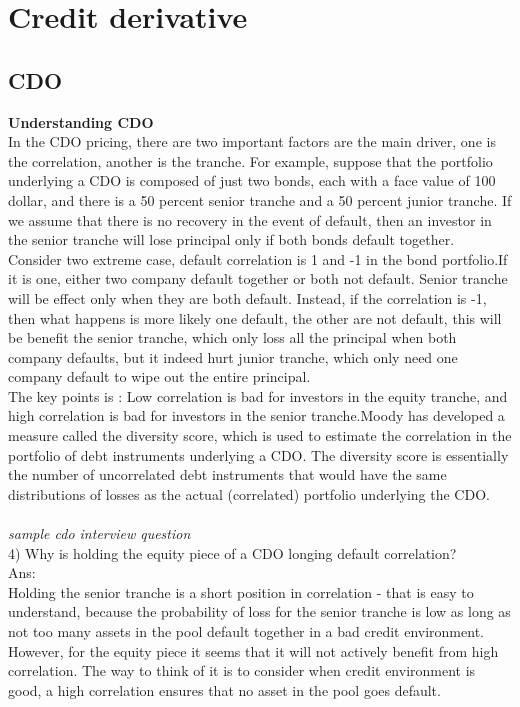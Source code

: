 \documentclass[a4paper,11pt]{article}
\begin{document}
\section{Credit derivative}
\subsection{CDO}
{\bf Understanding CDO}\\
In the CDO pricing, there are two important factors are the main driver, one is the correlation, another is the tranche. For example, suppose that the portfolio underlying a CDO is composed of just two bonds, each with
a face value of 100 dollar, and there is a 50 percent senior tranche and a 50 percent junior tranche. If we assume that there is no recovery in the event of default, then an investor in the senior tranche will lose principal only if both bonds default together. Consider two extreme case, default correlation is 1 and -1 in the bond portfolio.If it is one, either two company default together or both not default. Senior tranche will be effect only when they are both default. Instead, if the correlation is -1, then what happens is more likely one default, the other are not default, this will be benefit the senior tranche, which only loss all the principal when both company defaults, but it indeed hurt junior tranche, which only need one company default to wipe out the entire principal.\\
The key points is : Low correlation is bad for investors in the equity tranche, and high correlation is bad for investors in the senior tranche.Moody has developed a measure called the diversity score,
which is used to estimate the correlation in the portfolio of debt instruments underlying a CDO. The diversity
score is essentially the number of uncorrelated debt instruments that would have the same distributions of losses
as the actual (correlated) portfolio underlying the CDO.\\ \\
{\em sample cdo interview question\\}
4) Why is holding the equity piece of a CDO longing default correlation?\\
Ans:\\
Holding the senior tranche is a short position in correlation - that is easy to understand, because the probability of loss for the senior tranche is low as long as not too many assets in the pool default together in a bad credit environment. However, for the equity piece it seems that it will not actively benefit from high correlation. The way to think of it is to consider when credit environment is good, a high correlation ensures that no asset in the pool goes default.\\
\end{document}
